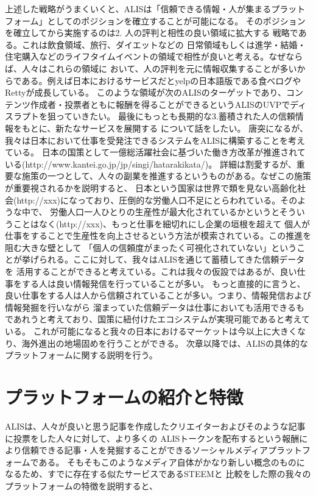\documentclass{jsarticle}
\begin{document}
上述した戦略がうまくいくと、ALISは「信頼できる情報・人が集まるプラットフォーム」としてのポジションを確立することが可能になる。
そのポジションを確立してから実施するのは2. 人の評判と相性の良い領域に拡大する 戦略である。これは飲食領域、旅行、ダイエットなどの
日常領域もしくは進学・結婚・住宅購入などのライフタイムイベントの領域で相性が良いと考える。なぜならば、人々はこれらの領域に
おいて、人の評判を元に情報収集することが多いからである。例えば日本におけるサービスだとyelpの日本語版である食べログやRettyが成長している。
このような領域が次のALISのターゲットであり、コンテンツ作成者・投票者ともに報酬を得ることができるというALISのUVPでディスラプトを狙っていきたい。
最後にもっとも長期的な3.蓄積された人の信頼情報をもとに、新たなサービスを展開する について話をしたい。
唐突になるが、我々は日本において仕事を受発注できるシステムをALISに構築することを考えている。
日本の国策として一億総活躍社会に基づいた働き方改革が推進されている(http://www.kantei.go.jp/jp/singi/hatarakikata/)。
詳細は割愛するが、重要な施策の一つとして、人々の副業を推進するというものがある。なぜこの施策が重要視されるかを説明すると、
日本という国家は世界で類を見ない高齢化社会(http://xxx)になっており、圧倒的な労働人口不足にとらわれている。そのような中で、
労働人口一人ひとりの生産性が最大化されているかというとそういうことはなく(http://xxx)、もっと仕事を細切れにし企業の垣根を超えて
個人が仕事をすることで生産性を向上させるという方法が模索されている。この推進を阻む大きな壁として
「個人の信頼度がまったく可視化されていない」ということが挙げられる。ここに対して、我々はALISを通じて蓄積してきた信頼データを
活用することができると考えている。これは我々の仮設ではあるが、良い仕事をする人は良い情報発信を行っていることが多い。
もっと直接的に言うと、良い仕事をする人は人から信頼されていることが多い。つまり、情報発信および情報発掘を行いながら
溜まっていた信頼データは仕事においても活用できるもであれうと考えており、国策に紐付けたエコシステムが実現可能であると考えている。
これが可能になると我々の日本におけるマーケットは今以上に大きくなり、海外進出の地場固めを行うことができる。
次章以降では、ALISの具体的なプラットフォームに関する説明を行う。
\section{プラットフォームの紹介と特徴}
ALISは、人々が良いと思う記事を作成したクリエイターおよびそのような記事に投票をした人々に対して、より多くの
ALISトークンを配布するという報酬により信頼できる記事・人を発掘することができるソーシャルメディアプラットフォームである。
そもそもこのようなメディア自体がかなり新しい概念のものになるため、すでに存在する似たサービスであるSTEEMと
比較をした際の我々のプラットフォームの特徴を説明すると、
\end{document}
